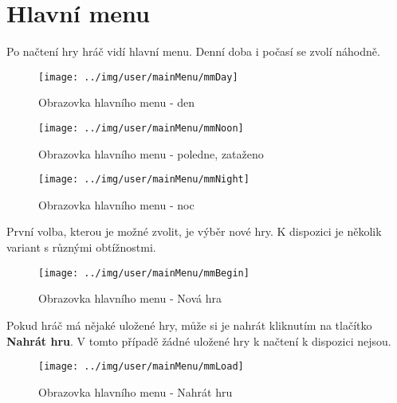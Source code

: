 
\section{Hlavní menu}

Po načtení hry hráč vidí hlavní menu. Denní doba i počasí se zvolí náhodně.

\begin{figure}[!h]\centering
\texttt{[image: ../img/user/mainMenu/mmDay]}

\caption{Obrazovka hlavního menu - den}
\label{fig:user_mainMenu_mmDay}

\end{figure}

\begin{figure}[!h]\centering
\texttt{[image: ../img/user/mainMenu/mmNoon]}

\caption{Obrazovka hlavního menu - poledne, zataženo}
\label{fig:user_mainMenu_mmNoon}

\end{figure}

\begin{figure}[!h]\centering
\texttt{[image: ../img/user/mainMenu/mmNight]}

\caption{Obrazovka hlavního menu - noc}
\label{fig:user_mainMenu_mmNight}

\end{figure}



\FloatBarrier

První volba, kterou je možné zvolit, je výběr nové hry. K dispozici je několik variant s různými obtížnostmi.

\begin{figure}[!h]\centering
\texttt{[image: ../img/user/mainMenu/mmBegin]}

\caption{Obrazovka hlavního menu - Nová hra}
\label{fig:user_mainMenu_mmBegin}

\end{figure}
\FloatBarrier

Pokud hráč má nějaké uložené hry, může si je nahrát kliknutím na tlačítko \textbf{Nahrát hru}. V tomto případě žádné uložené hry k načtení k dispozici nejsou.

\begin{figure}[!h]\centering
\texttt{[image: ../img/user/mainMenu/mmLoad]}

\caption{Obrazovka hlavního menu - Nahrát hru}
\label{fig:user_mainMenu_mmLoad}

\end{figure}
\FloatBarrier

